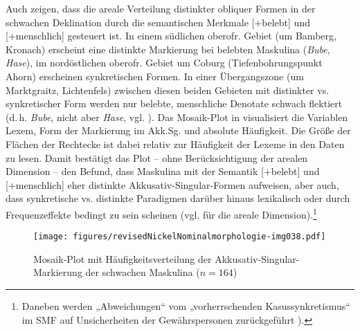 Auch \citet[183]{HarnischRowley1990} zeigen, dass die areale Verteilung distinkter obliquer Formen in der schwachen Deklination durch die semantischen Merkmale [+belebt] und [+menschlich] gesteuert ist. In einem südlichen oberofr. Gebiet (um Bamberg, Kronach) erscheint eine distinkte Markierung bei belebten Maskulina (\textit{Bube}, \textit{Hase}), im nordöstlichen oberofr. Gebiet um Coburg (Tiefenbohrungspunkt Ahorn) erscheinen synkretischen Formen. In einer Übergangszone (um Marktgraitz, Lichtenfels) zwischen diesen beiden Gebieten mit distinkter vs. synkretischer Form werden nur belebte, menschliche Denotate schwach flektiert (d.\,h. \textit{Bube}, nicht aber \textit{Hase}, vgl. \citealt[155 und 191]{Rowley1997}). Das Mosaik-Plot in   visualisiert die Variablen Lexem, Form der Markierung im Akk.Sg. und absolute Häufigkeit. Die Größe der Flächen der Rechtecke ist dabei relativ zur Häufigkeit der Lexeme in den Daten zu lesen. Damit bestätigt das Plot -- ohne Berücksichtigung der arealen Dimension -- den Befund, dass Maskulina mit der Semantik [+belebt] und [+menschlich] eher distinkte Akkusativ-Singular-Formen aufweisen, aber auch, dass synkretische vs. distinkte Paradigmen darüber hinaus lexikalisch oder durch Frequenzeffekte bedingt zu sein scheinen (vgl.  für die areale Dimension).\footnote{Daneben werden „Abweichungen“ vom „vorherrschenden Kasussynkretismus“ im SMF auf Unsicherheiten der Gewährspersonen zurückgeführt \citealt[19]{SMF7}).}


\begin{figure}
\texttt{[image: figures/revisedNickelNominalmorphologie-img038.pdf]}
\caption{Mosaik-Plot mit Häufigkeitsverteilung der Akkusativ-Singular-Markierung der schwachen Maskulina ($n=164$)}
\label{fig:9}
\end{figure}

